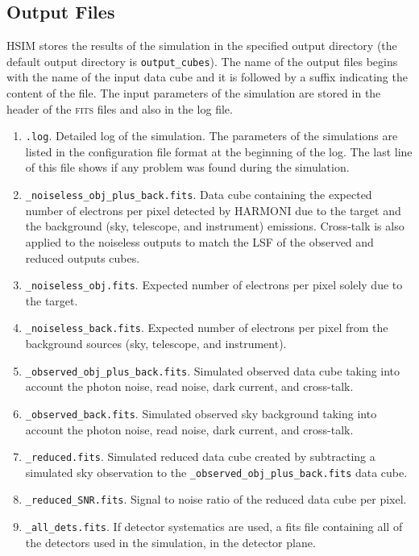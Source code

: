 \documentclass[12pt]{report}
\begin{document}
\subsection{Output Files}\label{s:output}

HSIM stores the results of the simulation in the specified output directory (the default output directory is \texttt{output\_cubes}). The name of the output files begins with the name of the input data cube and it is followed by a suffix indicating the content of the file. The input parameters of the simulation are stored in the header of the \textsc{fits} files and also in the log file.

\begin{enumerate}
\setlength\itemsep{-0.5ex}
\item \texttt{.log}. Detailed log of the simulation. The parameters of the simulations are listed in the configuration file format at the beginning of the log. The last line of this file shows if any problem was found during the simulation.
\item \texttt{\_noiseless\_obj\_plus\_back.fits}. Data cube containing the expected number of electrons per pixel detected by HARMONI due to the target and the background (sky, telescope, and instrument) emissions. Cross-talk is also applied to the noiseless outputs to match the LSF of the observed and reduced outputs cubes.
\item \texttt{\_noiseless\_obj.fits}. Expected number of electrons per pixel solely due to the target.
\item \texttt{\_noiseless\_back.fits}. Expected number of electrons per pixel from the background sources (sky, telescope, and instrument).
\item \texttt{\_observed\_obj\_plus\_back.fits}. Simulated observed data cube taking into account the photon noise, read noise, dark current, and cross-talk.
\item \texttt{\_observed\_back.fits}. Simulated observed sky background taking into account the photon noise, read noise, dark current, and cross-talk.
\item \texttt{\_reduced.fits}. Simulated reduced data cube created by subtracting a simulated sky observation  to the \texttt{\_observed\_obj\_plus\_back.fits} data cube.
\item \texttt{\_reduced\_SNR.fits}. Signal to noise ratio of the reduced data cube per pixel.
\item \texttt{\_all\_dets.fits}. If detector systematics are used, a fits file containing all of the detectors used in the simulation, in the detector plane.

\end{enumerate}
\end{document}
